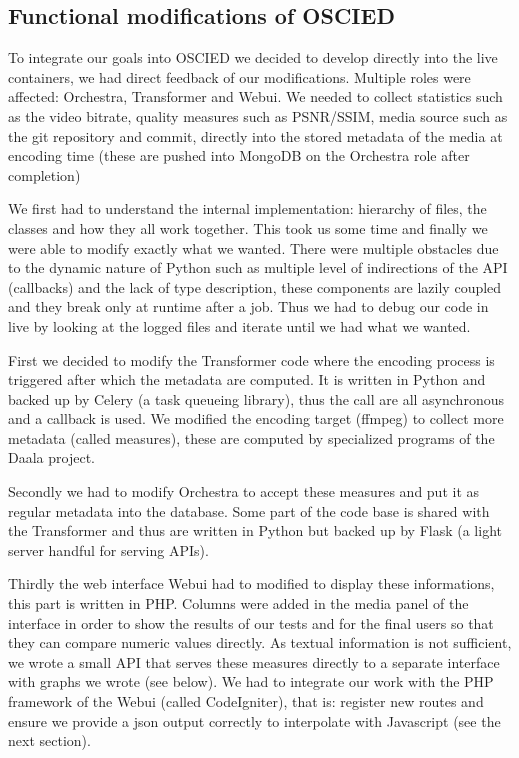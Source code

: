\documentclass[a4paper,12pt]{article}
\begin{document}

\subsection{Functional modifications of OSCIED}
To integrate our goals into OSCIED we decided to develop directly into the live
containers, we had direct feedback of our modifications.  Multiple roles were
affected: Orchestra, Transformer and Webui.  We needed to collect statistics
such as the video bitrate, quality measures such as PSNR/SSIM, media source such
as the git repository and commit, directly into the stored metadata of the media
at encoding time (these are pushed into MongoDB on the Orchestra role after
completion)

We first had to understand the internal implementation: hierarchy of files, the
classes and how they all work together.  This took us some time and finally we
were able to modify exactly what we wanted.  There were multiple obstacles due
to the dynamic nature of Python such as multiple level of indirections of the
API (callbacks) and the lack of type description, these components are lazily
coupled and they break only at runtime after a job.  Thus we had to debug our
code in live by looking at the logged files and iterate until we had what we
wanted.

First we decided to modify the Transformer code where the encoding process is
triggered after which the metadata are computed.  It is written in Python and
backed up by Celery (a task queueing library), thus the call are all
asynchronous and a callback is used.  We modified the encoding target (ffmpeg)
to collect more metadata (called measures), these are computed by specialized
programs of the Daala project.

Secondly we had to modify Orchestra to accept these measures and put it as
regular metadata into the database. Some part of the code base is shared with
the Transformer and thus are written in Python but backed up by Flask (a light
server handful for serving APIs).

Thirdly the web interface Webui had to modified to display these informations,
this part is written in PHP.  Columns were added in the media panel of the
interface in order to show the results of our tests and for the final users so
that they can compare numeric values directly.  As textual information is not
sufficient, we wrote a small API that serves these measures directly to a
separate interface with graphs we wrote (see below).  We had to integrate our
work with the PHP framework of the Webui (called CodeIgniter), that is: register
new routes and ensure we provide a json output correctly to interpolate with
Javascript (see the next section).
\end{document}
